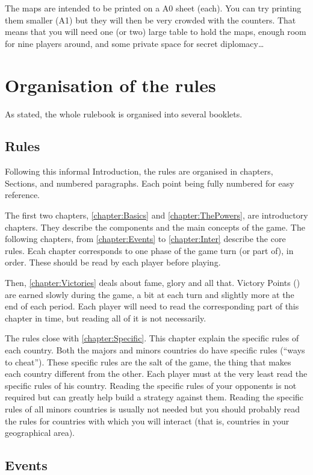 The maps are intended to be printed on a A0 sheet (each). You can try printing
them smaller (A1) but they will then be very crowded with the counters. That
means that you will need one (or two) large table to hold the maps, enough
room for nine players around, and some private space for secret
diplomacy\ldots

\section*{Organisation of the rules}
As stated, the whole rulebook is organised into several booklets.
\subsection*{Rules}

Following this informal Introduction, the rules are organised in chapters,
Sections, and numbered paragraphs. Each point being fully numbered for easy
reference.

The first two chapters, \ref{chapter:Basics} and \ref{chapter:ThePowers}, are
introductory chapters. They describe the components and the main concepts of
the game. The following chapters, from \ref{chapter:Events} to
\ref{chapter:Inter} describe the core rules. Ecah chapter corresponds to one
phase of the game turn (or part of), in order. These should be read by each
player before playing.

Then, \ref{chapter:Victories} deals about fame, glory and all that. Victory
Points (\VPs) are earned slowly during the game, a bit at each turn and
slightly more at the end of each period. Each player will need to read the
corresponding part of this chapter in time, but reading all of it is not
necessarily.

The rules close with \ref{chapter:Specific}. This chapter explain the specific
rules of each country. Both the majors and minors countries do have specific
rules (``ways to cheat''). These specific rules are the salt of the game, the
thing that makes each country different from the other. Each player must at
the very least read the specific rules of his country. Reading the specific
rules of your opponents is not required but can greatly help build a strategy
against them. Reading the specific rules of all minors countries is usually
not needed but you should probably read the rules for countries with which you
will interact (that is, countries in your geographical area).

\subsection*{Events}
